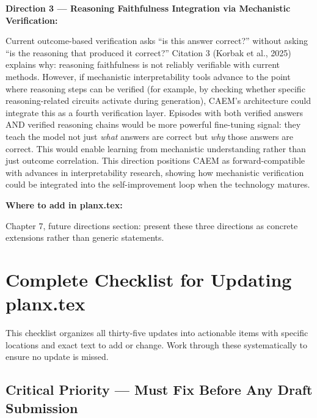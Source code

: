 \documentclass[11pt,a4paper]{article}
\begin{document}
{\textbf{Direction 3 — Reasoning Faithfulness Integration via Mechanistic Verification:}

Current outcome-based verification asks ``is this answer correct?'' without asking ``is the reasoning that produced it correct?'' Citation 3 (Korbak et al., 2025) explains why: reasoning faithfulness is not reliably verifiable with current methods. However, if mechanistic interpretability tools advance to the point where reasoning steps can be verified (for example, by checking whether specific reasoning-related circuits activate during generation), CAEM's architecture could integrate this as a fourth verification layer. Episodes with both verified answers AND verified reasoning chains would be more powerful fine-tuning signal: they teach the model not just \textit{what} answers are correct but \textit{why} those answers are correct. This would enable learning from mechanistic understanding rather than just outcome correlation. This direction positions CAEM as forward-compatible with advances in interpretability research, showing how mechanistic verification could be integrated into the self-improvement loop when the technology matures.

\textbf{Where to add in planx.tex:}

Chapter 7, future directions section: present these three directions as concrete extensions rather than generic statements.
}

\newpage

\section{Complete Checklist for Updating planx.tex}
\label{sec:checklist}

This checklist organizes all thirty-five updates into actionable items with specific locations and exact text to add or change. Work through these systematically to ensure no update is missed.

\subsection{Critical Priority — Must Fix Before Any Draft Submission}
\end{document}
